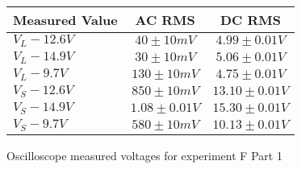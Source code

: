 \begin{figure}[H]    \centering    \begin{tabular}{|l|c|c|}
        \hline
        Measured Value & AC RMS & DC RMS \\
        \hline
        $V_{L} - 12.6\unit{V}$ & $40\pm 10\unit{mV}$ & $4.99\pm 0.01\unit{V}$ \\
        $V_{L} - 14.9\unit{V}$ & $30\pm 10\unit{mV}$ & $5.06\pm 0.01\unit{V}$ \\
        $V_{L} - 9.7\unit{V}$ & $130\pm 10\unit{mV}$ & $4.75\pm 0.01\unit{V}$ \\
        $V_{S} - 12.6\unit{V}$ & $850\pm 10\unit{mV}$ & $13.10\pm 0.01\unit{V}$ \\
        $V_{S} - 14.9\unit{V}$ & $1.08\pm 0.01\unit{V}$ & $15.30\pm 0.01\unit{V}$ \\
        $V_{S} - 9.7\unit{V}$ & $580\pm 10\unit{mV}$ & $10.13\pm 0.01\unit{V}$ \\
        \hline
    \end{tabular}    \caption{Oscilloscope measured voltages for experiment F Part 1}\end{figure}